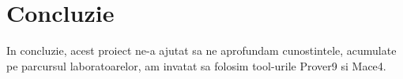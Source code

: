  \section{Concluzie}
 
In concluzie, acest proiect ne-a ajutat sa ne aprofundam cunostintele, acumulate pe parcursul laboratoarelor, am invatat sa folosim tool-urile Prover9 si Mace4.
